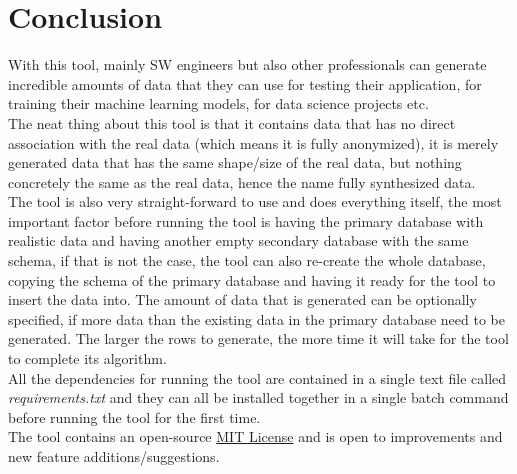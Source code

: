 \section{Conclusion}
With this tool, mainly SW engineers but also other professionals can generate incredible amounts of data that they can use for testing their application, for training their machine learning models, for data science projects etc.\\
\newline
The neat thing about this tool is that it contains data that has no direct association with the real data (which means it is fully anonymized), it is merely generated data that has the same shape/size of the real data, but nothing concretely the same as the real data, hence the name fully synthesized data.\\
\newline
The tool is also very straight-forward to use and does everything itself, the most important factor before running the tool is having the primary database with realistic data and having another empty secondary database with the same schema, if that is not the case, the tool can also re-create the whole database, copying the schema of the primary database and having it ready for the tool to insert the data into. The amount of data that is generated can be optionally specified, if more data than the existing data in the primary database need to be generated. The larger the rows to generate, the more time it will take for the tool to complete its algorithm.\\
All the dependencies for running the tool are contained in a single text file called \textit{requirements.txt} and they can all be installed together in a single batch command before running the tool for the first time.\\
\newline
The tool contains an open-source \href{https://opensource.org/licenses/MIT}{MIT License} and is open to improvements and new feature additions/suggestions.

